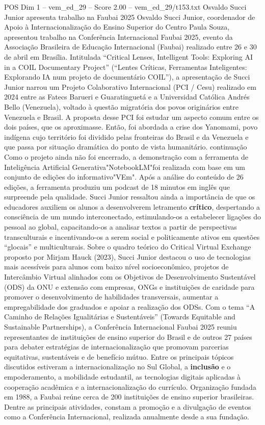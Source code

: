 \begin{textsample}{POS Dim 1 – vem\_ed\_29 – Score 2.00 – vem\_ed\_29/t153.txt}  \label{ex:f1_pos_008}
Osvaldo Succi Junior apresenta trabalho na Faubai 2025 Osvaldo Succi Junior, coordenador de Apoio à Internacionalização do Ensino Superior do Centro Paula Souza, apresentou trabalho na Conferência Internacional Faubai 2025, evento da Associação Brasileira de Educação Internacional (Faubai) realizado entre 26 e 30 de abril em Brasília.
Intitulada “Critical Lenses, Intelligent Tools: Exploring AI in a COIL Documentary Project” (“Lentes Críticas, Ferramentas Inteligentes: Explorando IA num projeto de documentário COIL”), a apresentação de Succi Junior narrou um Projeto Colaborativo Internacional (PCI / Cesu) realizado em 2024 entre as Fatecs Barueri e Guaratinguetá e a Universidad Católica Andrés Bello (Venezuela), voltado à questão migratória dos povos originários entre Venezuela e Brasil.
A proposta desse PCI foi estudar um aspecto comum entre os dois países, que os aproximasse.
Então, foi abordada a crise dos Yanomami, povo indígena cujo território foi dividido pelas fronteiras do Brasil e da Venezuela e que passa por situação dramática do ponto de vista humanitário. continuação Como o projeto ainda não foi encerrado, a demonstração com a ferramenta de Inteligência Artificial Generativa"NotebookLM"foi realizada com base em um conjunto de edições do informativo"VEm".
Após a análise do conteúdo de 26 edições, a ferramenta produziu um podcast de 18 minutos em inglês que surpreende pela qualidade.
Succi Junior ressaltou ainda a importância de que os educadores auxiliem os alunos a desenvolverem letramento \textbf{crítico}, despertando a consciência de um mundo interconectado, estimulando-os a estabelecer ligações do pessoal ao global, capacitando-os a analisar textos a partir de perspectivas transculturais e incentivando-os a serem social e politicamente ativos em questões “glocais” e multiculturais.
Sobre o quadro teórico do Critical Virtual Exchange proposto por Mirjam Hauck (2023), Succi Junior destacou o uso de tecnologias mais acessíveis para alunos com baixo nível socioeconômico, projetos de Intercâmbio Virtual alinhados com os Objetivos de Desenvolvimento Sustentável (ODS) da ONU e extensão com empresas, ONGs e instituições de caridade para promover o desenvolvimento de habilidades transversais, aumentar a empregabilidade dos graduados e apoiar a realização dos ODSs.
Com o tema “A Caminho de Relações Igualitárias e Sustentáveis” (Towards Equitable and Sustainable Partnerships), a Conferência Internacional Faubai 2025 reuniu representantes de instituições de ensino superior do Brasil e de outros 27 países para debater estratégias de internacionalização que promovam parcerias equitativas, sustentáveis e de benefício mútuo.
Entre os principais tópicos discutidos estiveram a internacionalização no Sul Global, a \textbf{inclusão} e o empoderamento, a mobilidade estudantil, as tecnologias digitais aplicadas à cooperação acadêmica e a internacionalização do currículo.
Organização fundada em 1988, a Faubai reúne cerca de 200 instituições de ensino superior brasileiras.
Dentre as principais atividades, constam a promoção e a divulgação de eventos como a Conferência Internacional, realizada anualmente desde a sua fundação.

\end{textsample}
